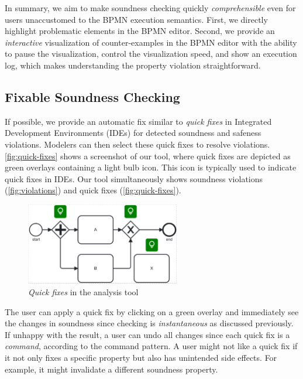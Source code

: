 \documentclass[runningheads]{llncs}
\begin{document}
In summary, we aim to make soundness checking quickly \textit{comprehensible} even for users unaccustomed to the BPMN execution semantics.
First, we directly highlight problematic elements in the BPMN editor.
Second, we provide an \textit{interactive} visualization of counter-examples in the BPMN editor with the ability to pause the visualization, control the visualization speed, and show an execution log, which makes understanding the property violation straightforward.

\subsection{Fixable Soundness Checking}

If possible, we provide an automatic fix similar to \textit{quick fixes} in Integrated Development Environments (IDEs) for detected soundness and safeness violations.
Modelers can then select these quick fixes to resolve violations.
\autoref{fig:quick-fixes} shows a screenshot of our tool, where quick fixes are depicted as green overlays containing a light bulb icon.
This icon is typically used to indicate quick fixes in IDEs.
Our tool simultaneously shows soundness violations (\autoref{fig:violations}) and quick fixes (\autoref{fig:quick-fixes}).

\begin{figure}[ht]
	\centering
	\includegraphics[width=0.6\textwidth]{images/quickfixes}
	\caption{\textit{Quick fixes} in the analysis tool}
	\label{fig:quick-fixes}
\end{figure}

The user can apply a quick fix by clicking on a green overlay and immediately see the changes in soundness since checking is \textit{instantaneous} as discussed previously.
If unhappy with the result, a user can undo all changes since each quick fix is a \textit{command}, according to the command pattern.
A user might not like a quick fix if it not only fixes a specific property but also has unintended side effects.
For example, it might invalidate a different soundness property.
\end{document}
